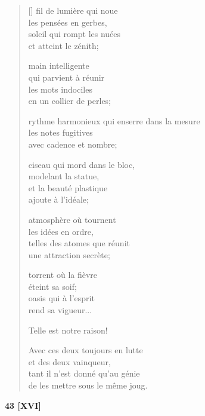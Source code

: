 \documentclass[a4paper,12pt]{book}
\begin{document}
\begin{verse}[\versewidth]
  fil de lumière qui noue \\
  les pensées en gerbes, \\
  soleil qui rompt les nuées \\
  et atteint le zénith;

  main intelligente \\
  qui parvient à réunir \\
  les mots indociles \\
  en un collier de perles;

  rythme harmonieux
  qui enserre dans la mesure \\
  les notes fugitives \\
  avec cadence et nombre;

  ciseau qui mord dans le bloc, \\
  modelant la statue, \\
  et la beauté plastique \\
  ajoute à l'idéale;

  atmosphère où tournent \\
  les idées en ordre, \\
  telles des atomes que réunit \\
  une attraction secrète;

  torrent où la fièvre \\
  éteint sa soif; \\
  oasis qui à l'esprit \\
  rend sa vigueur...

  Telle est notre raison!

  Avec ces deux toujours en lutte \\
  et des deux vainqueur, \\
  tant il n'est donné qu'au génie \\
  de les mettre sous le même joug.
\end{verse}

\bigskip

\begin{center}
  \textbf{43 [XVI]}
\end{center}

\settowidth{\versewidth}{Si, quand les clochettes bleues de ton balcon}
\end{document}

